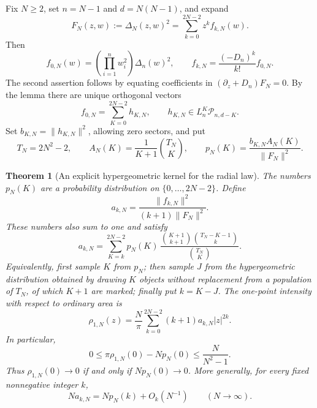 \documentclass[11pt,a4paper]{article}
\numberwithin{equation}{section}
\newtheorem{theorem}{Theorem}[section]
\theoremstyle{definition}
\theoremstyle{remark}
\begin{document}
Fix $N\geq2$, set $n=N-1$ and $d=N(N-1)$, and expand
\[
 F_N(z,w):=\Delta_N(z,w)^2=\sum_{k=0}^{2N-2}z^k f_{k,N}(w).
\]
Then
\begin{equation}
 f_{0,N}(w)=\left(\prod_{i=1}^n w_i^2\right)\Delta_n(w)^2,
 \qquad
 f_{k,N}=\frac{(-D_n)^k}{k!}f_{0,N}.
 \label{eq:critical-su11-coefficients}
\end{equation}
The second assertion follows by equating coefficients in
$(\partial_z+D_n)F_N=0$. By the lemma there are unique orthogonal vectors
\[
 f_{0,N}=\sum_{K=0}^{2N-2} h_{K,N},\qquad
 h_{K,N}\in L_n^K\mathcal P_{n,d-K}.
\]
Set $b_{K,N}=\|h_{K,N}\|^2$, allowing zero sectors, and put
\begin{equation}
 T_N=2N^2-2,\qquad
 A_N(K)=\frac1{K+1}\binom{T_N}{K},\qquad
 p_N(K)=\frac{b_{K,N}A_N(K)}{\|F_N\|^2}.
 \label{eq:critical-su11-sector-probabilities}
\end{equation}

\begin{theorem}[An explicit hypergeometric kernel for the radial law]
\label{thm:critical-su11-hypergeometric}
The numbers $p_N(K)$ are a probability distribution on
$\{0,\ldots,2N-2\}$. Define
\begin{equation}
 a_{k,N}=\frac{\|f_{k,N}\|^2}{(k+1)\|F_N\|^2}.
 \label{eq:critical-su11-orbital-probability}
\end{equation}
These numbers also sum to one and satisfy
\begin{equation}
 a_{k,N}=\sum_{K=k}^{2N-2}p_N(K)\,
 \frac{\binom{K+1}{k+1}\binom{T_N-K-1}{k}}
      {\binom{T_N}{K}}.
 \label{eq:critical-su11-hypergeometric-mixture}
\end{equation}
Equivalently, first sample $K$ from $p_N$; then sample $J$ from the
hypergeometric distribution obtained by drawing $K$ objects without
replacement from a population of $T_N$, of which $K+1$ are marked;
finally put $k=K-J$.
The one-point intensity with respect to ordinary area is
\begin{equation}
 \rho_{1,N}(z)=\frac N\pi\sum_{k=0}^{2N-2}(k+1)a_{k,N}|z|^{2k}.
 \label{eq:critical-su11-intensity}
\end{equation}
In particular,
\begin{equation}
 0\leq\pi\rho_{1,N}(0)-Np_N(0)
       \leq\frac N{N^2-1}.
 \label{eq:critical-su11-primary-obstruction}
\end{equation}
Thus $\rho_{1,N}(0)\to0$ if and only if $Np_N(0)\to0$.
More generally, for every fixed nonnegative integer $k$,
\begin{equation}
 Na_{k,N}=Np_N(k)+O_k(N^{-1})\qquad(N\to\infty).
 \label{eq:critical-su11-fixed-orbitals}
\end{equation}
\end{theorem}
\end{document}
